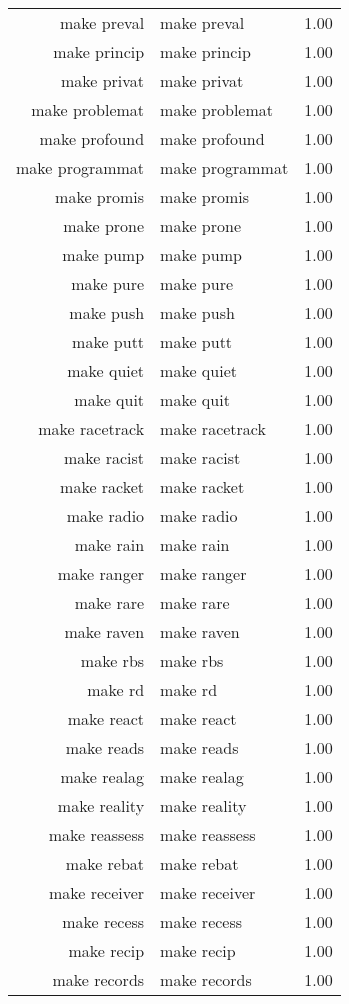 \begin{table}[ht]
\begin{tabular}{rlr}
  make preval & make preval & 1.00 \\ 
  make princip & make princip & 1.00 \\ 
  make privat & make privat & 1.00 \\ 
  make problemat & make problemat & 1.00 \\ 
  make profound & make profound & 1.00 \\ 
  make programmat & make programmat & 1.00 \\ 
  make promis & make promis & 1.00 \\ 
  make prone & make prone & 1.00 \\ 
  make pump & make pump & 1.00 \\ 
  make pure & make pure & 1.00 \\ 
  make push & make push & 1.00 \\ 
  make putt & make putt & 1.00 \\ 
  make quiet & make quiet & 1.00 \\ 
  make quit & make quit & 1.00 \\ 
  make racetrack & make racetrack & 1.00 \\ 
  make racist & make racist & 1.00 \\ 
  make racket & make racket & 1.00 \\ 
  make radio & make radio & 1.00 \\ 
  make rain & make rain & 1.00 \\ 
  make ranger & make ranger & 1.00 \\ 
  make rare & make rare & 1.00 \\ 
  make raven & make raven & 1.00 \\ 
  make rbs & make rbs & 1.00 \\ 
  make rd & make rd & 1.00 \\ 
  make react & make react & 1.00 \\ 
  make reads & make reads & 1.00 \\ 
  make realag & make realag & 1.00 \\ 
  make reality & make reality & 1.00 \\ 
  make reassess & make reassess & 1.00 \\ 
  make rebat & make rebat & 1.00 \\ 
  make receiver & make receiver & 1.00 \\ 
  make recess & make recess & 1.00 \\ 
  make recip & make recip & 1.00 \\ 
  make records & make records & 1.00 \\ 

\end{tabular}
\end{table}
